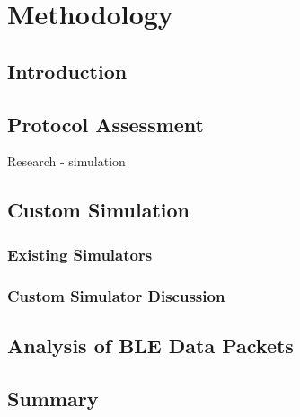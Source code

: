 \chapter{Methodology}

    \section{Introduction}

    \section{Protocol Assessment}
    Research - simulation

    \section{Custom Simulation}
      \subsection{Existing Simulators}
      \subsection{Custom Simulator Discussion}

    \section{Analysis of BLE Data Packets}

    \section{Summary}
